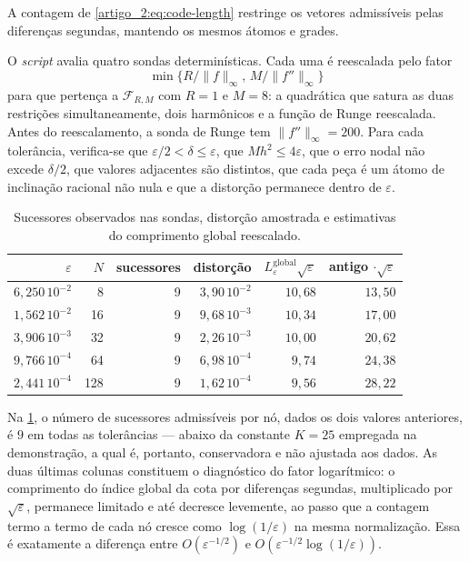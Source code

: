 A contagem de \eqref{artigo_2:eq:code-length} restringe os vetores admissíveis pelas diferenças segundas, mantendo os mesmos átomos e grades.

O \emph{script} avalia quatro sondas determinísticas. Cada uma é reescalada pelo fator
\[\min\{R/\|f\|_\infty,\,M/\|f''\|_\infty\}\]
para que pertença a
$\mathcal F_{R,M}$ com $R=1$ e $M=8$: a quadrática que satura as duas
restrições simultaneamente, dois harmônicos e a função de Runge reescalada.
Antes do reescalamento, a sonda de Runge tem $\|f''\|_\infty=200$. Para cada tolerância, verifica-se que
$\varepsilon/2<\delta\le\varepsilon$, que $Mh^2\le4\varepsilon$, que o erro
nodal não excede $\delta/2$, que valores adjacentes são distintos, que cada
peça é um átomo de inclinação racional não nula e que a distorção permanece dentro
de $\varepsilon$.

\begin{table}[t]
\centering
\caption{Sucessores observados nas sondas, distorção amostrada e estimativas do comprimento global reescalado.}
\label{artigo_2:tab:codebook-pt}
\small
\begin{tabular}{rrrrrr}
\toprule
$\varepsilon$ & $N$ & sucessores & distorção & $L_\varepsilon^{\mathrm{global}}\sqrt{\varepsilon}$ & antigo $\cdot\sqrt{\varepsilon}$\\
\midrule
$6{,}250\,10^{-2}$ & 8   & 9 & $3{,}90\,10^{-2}$ & $10{,}68$ & $13{,}50$\\
$1{,}562\,10^{-2}$ & 16  & 9 & $9{,}68\,10^{-3}$ & $10{,}34$ & $17{,}00$\\
$3{,}906\,10^{-3}$ & 32  & 9 & $2{,}26\,10^{-3}$ & $10{,}00$ & $20{,}62$\\
$9{,}766\,10^{-4}$ & 64  & 9 & $6{,}98\,10^{-4}$ & $9{,}74$  & $24{,}38$\\
$2{,}441\,10^{-4}$ & 128 & 9 & $1{,}62\,10^{-4}$ & $9{,}56$  & $28{,}22$\\
\bottomrule
\end{tabular}
\end{table}

Na \cref{artigo_2:tab:codebook-pt}, o número de sucessores
admissíveis por nó, dados os dois valores anteriores, é $9$ em todas as
tolerâncias --- abaixo da constante $K=25$ empregada na demonstração, a qual é,
portanto, conservadora e não ajustada aos dados. As duas últimas colunas constituem o
diagnóstico do fator logarítmico: o comprimento do índice global da cota por diferenças segundas,
multiplicado por $\sqrt{\varepsilon}$, permanece limitado e até decresce
levemente, ao passo que a contagem termo a termo de cada nó cresce
como $\log(1/\varepsilon)$ na mesma normalização. Essa é exatamente a diferença
entre $O(\varepsilon^{-1/2})$ e $O(\varepsilon^{-1/2}\log(1/\varepsilon))$.


